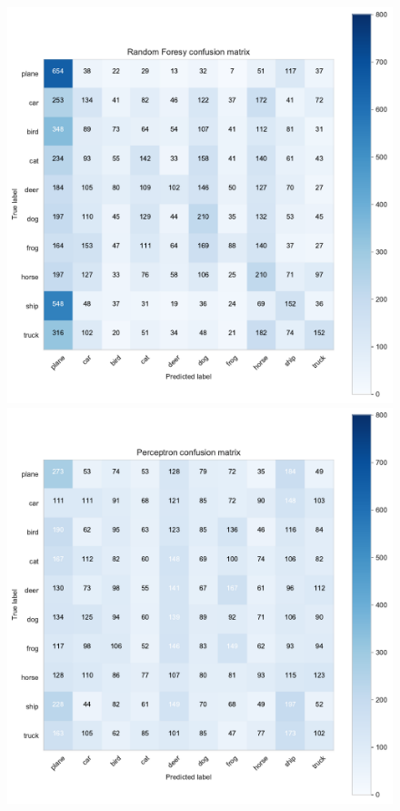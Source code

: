 \documentclass[11pt]{article}
\begin{document}
\begin{figure}[H]
\begin{minipage}[c]{0.5\textwidth}
\includegraphics[width=1\linewidth]{figures/Cifar/CM__Rndf_color_hist.pdf}
\end{minipage}
\begin{minipage}[c]{0.5\textwidth}
\includegraphics[width=1\linewidth]{figures/Cifar/CM__ppn_color_hist.pdf}

\end{minipage}
\end{figure}
\end{document}
